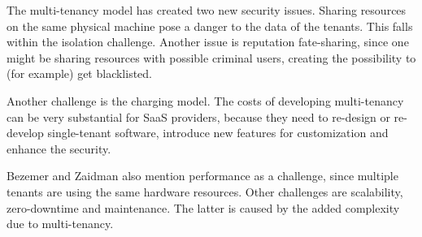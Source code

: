 The multi-tenancy model has created two new security issues\cite{dillon2010cloud}. Sharing resources on the same physical machine pose a danger to the data of the tenants. This falls within the isolation challenge. Another issue is reputation fate-sharing, since one might be sharing resources with possible criminal users, creating the possibility to (for example) get blacklisted.

Another challenge is the charging model. The costs of developing multi-tenancy can be very substantial for SaaS providers, because they need to re-design or re-develop single-tenant software, introduce new features for customization and enhance the security.

Bezemer and Zaidman\cite{bezemer2010multi} also mention performance as a challenge, since multiple tenants are using the same hardware resources. Other challenges are scalability, zero-downtime and maintenance. The latter is caused by the added complexity due to multi-tenancy.